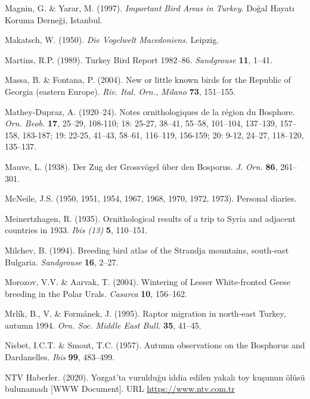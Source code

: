 \documentclass[
  a4paper,
  DIV=11,
  numbers=noendperiod]{scrreprt}
\newlength{\cslhangindent}
\newenvironment{CSLReferences}[2] %
 {\begin{list}{}{%
  \setlength{\itemindent}{0pt}
  \setlength{\leftmargin}{0pt}
  \setlength{\parsep}{0pt}
  \ifodd #1
   \setlength{\leftmargin}{\cslhangindent}
   \setlength{\itemindent}{-1\cslhangindent}
  \fi
  \setlength{\itemsep}{#2\baselineskip}}}
 {\end{list}}
\begin{document}
\begin{CSLReferences}{1}{1}
Magnin, G. \& Yarar, M. (1997). \emph{{Important Bird Areas in Turkey}}.
Doğal Hayatı Koruma Derneği, Istanbul.

Makatsch, W. (1950). \emph{{Die Vogelwelt Macedoniens}}. Leipzig.

Martins, R.P. (1989). {Turkey Bird Report 1982--86}. \emph{Sandgrouse}
\textbf{11}, 1--41.

Massa, B. \& Fontana, P. (2004). {New or little known birds for the
Republic of Georgia (eastern Europe)}. \emph{Riv. Ital. Orn., Milano}
\textbf{73}, 151--155.

Mathey-Dupraz, A. (1920--24). {Notes ornithologiques de la région du
Bosphore}. \emph{Orn. Beob.} \textbf{17}, 25--29, 108-110; 18: 25-27,
38--41, 55--58, 101--104, 137--139, 157--158, 183-187; 19: 22-25,
41--43, 58--61, 116--119, 156-159; 20: 9-12, 24--27, 118--120, 135--137.

Mauve, L. (1938). {Der Zug der Grossvögel über den Bosporus}. \emph{J.
Orn.} \textbf{86}, 261--301.

McNeile, J.S. (1950, 1951, 1954, 1967, 1968, 1970, 1972, 1973).
{Personal diaries}.

Meinertzhagen, R. (1935). {Ornithological results of a trip to Syria and
adjacent countries in 1933}. \emph{Ibis (13)} \textbf{5}, 110--151.

Milchev, B. (1994). {Breeding bird atlas of the Strandja mountains,
south-east Bulgaria}. \emph{Sandgrouse} \textbf{16}, 2--27.

Morozov, V.V. \& Aarvak, T. (2004). {Wintering of Lesser White-fronted
Geese breeding in the Polar Urals}. \emph{Casarca} \textbf{10},
156--162.

Mrlík, B., V. \& Formánek, J. (1995). {Raptor migration in north-east
Turkey, autumn 1994}. \emph{Orn. Soc. Middle East Bull.} \textbf{35},
41--45.

Nisbet, I.C.T. \& Smout, T.C. (1957). {Autumn observations on the
Bosphorus and Dardanelles}. \emph{Ibis} \textbf{99}, 483--499.

NTV Haberler. (2020). Yozgat'ta vurulduğu iddia edilen yakalı toy
kuşunun ölüsü bulunamadı {[}WWW Document{]}. URL
\url{https://www.ntv.com.tr}


\end{CSLReferences}
\end{document}
